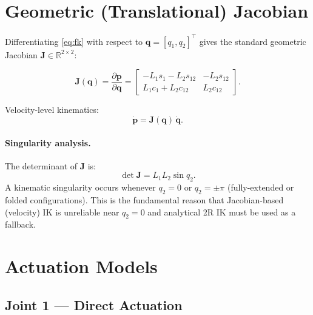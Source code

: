 \documentclass[12pt, a4paper]{article}
\theoremstyle{definition}
\newcommand{\bq}{\bm{q}}
\newcommand{\bp}{\bm{p}}
\newcommand{\bJ}{\bm{J}}
\newcommand{\cq}[1]{c_{#1}}   %
\newcommand{\sq}[1]{s_{#1}}   %
\newcommand{\cqq}[2]{c_{{#1}{#2}}}  %
\newcommand{\sqq}[2]{s_{{#1}{#2}}}  %
\begin{document}
\section{Geometric (Translational) Jacobian}
\label{sec:geo_jacobian}

Differentiating \cref{eq:fk} with respect to $\bq = [q_1, q_2]^\top$ gives the
standard geometric Jacobian $\bJ \in \mathbb{R}^{2 \times 2}$:

\begin{equation}
  \label{eq:Jgeo}
  \bJ(\bq)
  = \frac{\partial \bp}{\partial \bq}
  = \begin{bmatrix}
      -L_1 \sq{1} - L_2 \sqq{1}{2} & -L_2 \sqq{1}{2} \\[4pt]
       L_1 \cq{1} + L_2 \cqq{1}{2} &  L_2 \cqq{1}{2}
    \end{bmatrix}.
\end{equation}

\noindent
Velocity-level kinematics:
\begin{equation}
  \label{eq:vel_fk}
  \dot{\bp} = \bJ(\bq)\,\dot{\bq}.
\end{equation}

\paragraph{Singularity analysis.}
The determinant of $\bJ$ is:
\begin{equation}
  \det\bJ = L_1 L_2 \sin q_2 .
\end{equation}
A kinematic singularity occurs whenever $q_2 = 0$ or $q_2 = \pm\pi$
(fully-extended or folded configurations).  This is the fundamental reason that
Jacobian-based (velocity) IK is unreliable near $q_2 = 0$ and analytical 2R IK
must be used as a fallback.

\section{Actuation Models}
\label{sec:actuation}

\subsection{Joint 1 --- Direct Actuation}
\label{sec:act_j1}
\end{document}
